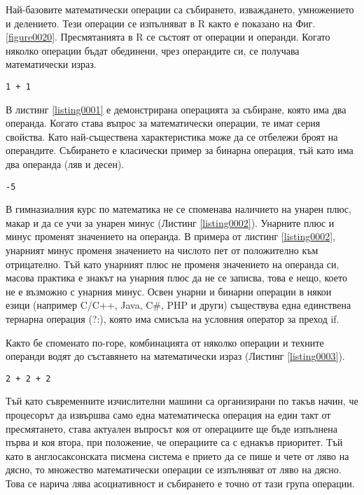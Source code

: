 Най-базовите математически операции са събирането, изваждането, умножението и делението. Тези операции се изпълняват в R както е показано на Фиг. \ref{figure0020}. Пресмятанията в R се състоят от операции и операнди. Когато няколко операции бъдат обединени, чрез операндите си, се получава математически израз.

\begin{lstlisting}[caption=Събиране, label=listing0001]
1 + 1
\end{lstlisting}

В листинг \ref{listing0001} е демонстрирана операцията за събиране, която има два операнда. Когато става въпрос за математически операции, те имат серия свойства. Като най-съществена характеристика може да се отбележи броят на операндите. Събирането е класически пример за бинарна операция, тъй като има два операнда (ляв и десен).

\begin{lstlisting}[caption=Унарен минус, label=listing0002]
-5
\end{lstlisting}

В гимназиалния курс по математика не се споменава наличието на унарен плюс, макар и да се учи за унарен минус (Листинг \ref{listing0002}). Унарните плюс и минус променят значението на операнда. В примера от листинг \ref{listing0002}, унарният минус променя значението на числото пет от положително към отрицателно. Тъй като унарният плюс не променя значението на операнда си, масова практика е знакът на унарния плюс да не се записва, това е нещо, което не е възможно с унарния минус. Освен унарни и бинарни операции в някои езици (например C/C++, Java, C\#, PHP и други) съществува една единствена тернарна операция (?:), която има смисъла на условния оператор за преход if.

Както бе споменато по-горе, комбинацията от няколко операции и техните операнди водят до съставянето на математически израз (Листинг \ref{listing0003}).

\begin{lstlisting}[caption=Аритметичен израз с две събирания, label=listing0003]
2 + 2 + 2
\end{lstlisting}

Тъй като съвременните изчислителни машини са организирани по такъв начин, че процесорът да извършва само една математическа операция на един такт от пресмятането, става актуален въпросът коя от операциите ще бъде изпълнена първа и коя втора, при положение, че операциите са с еднакъв приоритет. Тъй като в англосаксонската писмена система е прието да се пише и чете от ляво на дясно, то множество математически операции се изпълняват от ляво на дясно. Това се нарича лява асоциативност и събирането е точно от тази група операции.

